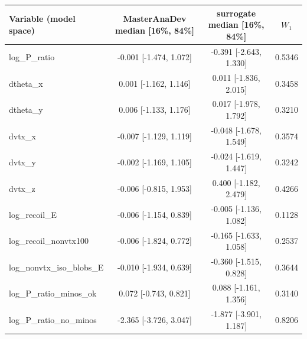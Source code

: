 \begin{tabular}{lccc}
\toprule
Variable (model space) & MasterAnaDev median [16\%, 84\%] & surrogate median [16\%, 84\%] & $W_1$ \\
\midrule
log\_P\_ratio & -0.001 [-1.474, 1.072] & -0.391 [-2.643, 1.330] & 0.5346 \\
dtheta\_x & 0.001 [-1.162, 1.146] & 0.011 [-1.836, 2.015] & 0.3458 \\
dtheta\_y & 0.006 [-1.133, 1.176] & 0.017 [-1.978, 1.792] & 0.3210 \\
dvtx\_x & -0.007 [-1.129, 1.119] & -0.048 [-1.678, 1.549] & 0.3574 \\
dvtx\_y & -0.002 [-1.169, 1.105] & -0.024 [-1.619, 1.447] & 0.3242 \\
dvtx\_z & -0.006 [-0.815, 1.953] & 0.400 [-1.182, 2.479] & 0.4266 \\
log\_recoil\_E & -0.006 [-1.154, 0.839] & -0.005 [-1.136, 1.082] & 0.1128 \\
log\_recoil\_nonvtx100 & -0.006 [-1.824, 0.772] & -0.165 [-1.633, 1.058] & 0.2537 \\
log\_nonvtx\_iso\_blobs\_E & -0.010 [-1.934, 0.639] & -0.360 [-1.515, 0.828] & 0.3644 \\
log\_P\_ratio\_minos\_ok & 0.072 [-0.743, 0.821] & 0.088 [-1.161, 1.356] & 0.3140 \\
log\_P\_ratio\_no\_minos & -2.365 [-3.726, 3.047] & -1.877 [-3.901, 1.187] & 0.8206 \\
\bottomrule
\end{tabular}
